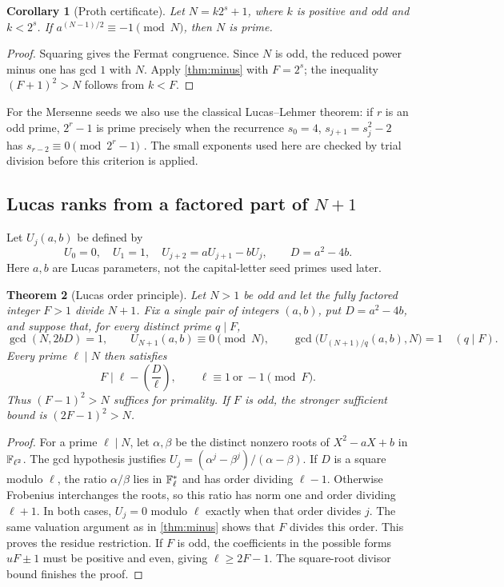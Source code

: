 \documentclass[11pt,a4paper]{article}
\newtheorem{theorem}{Theorem}[section]
\newtheorem{corollary}[theorem]{Corollary}
\theoremstyle{definition}\newtheorem{definition}[theorem]{Definition}
\theoremstyle{remark}\newtheorem{remark}[theorem]{Remark}
\begin{document}
\begin{corollary}[Proth certificate]\label{cor:proth}
Let $N=k2^s+1$, where $k$ is positive and odd and $k<2^s$. If
$a^{(N-1)/2}\equiv-1\pmod N$, then $N$ is prime.
\end{corollary}
\begin{proof}
Squaring gives the Fermat congruence. Since $N$ is odd, the reduced power minus
one has gcd $1$ with $N$. Apply \cref{thm:minus} with $F=2^s$; the inequality
$(F+1)^2>N$ follows from $k<F$.
\end{proof}

For the Mersenne seeds we also use the classical Lucas--Lehmer theorem:
if $r$ is an odd prime, $2^r-1$ is prime precisely when the recurrence
$s_0=4$, $s_{j+1}=s_j^2-2$ has $s_{r-2}\equiv0\pmod{2^r-1}$
\cite{lehmertest}. The small exponents used here are checked by trial division
before this criterion is applied.

\subsection{Lucas ranks from a factored part of \texorpdfstring{$N+1$}{N+1}}

Let $U_j(a,b)$ be defined by
\[
 U_0=0,\quad U_1=1,\quad U_{j+2}=aU_{j+1}-bU_j,
 \qquad D=a^2-4b.
\]
Here $a,b$ are Lucas parameters, not the capital-letter seed primes used later.

\begin{theorem}[Lucas order principle]\label{thm:plus}
Let $N>1$ be odd and let the fully factored integer $F>1$ divide $N+1$.
Fix a single pair of integers $(a,b)$, put $D=a^2-4b$, and suppose that,
for every distinct prime $q\mid F$,
\begin{equation}\label{eq:lucas}
 \gcd(N,2bD)=1,\qquad U_{N+1}(a,b)\equiv0\pmod N,
 \qquad \gcd\bigl(U_{(N+1)/q}(a,b),N\bigr)=1
 \quad(q\mid F).
\end{equation}
Every prime $\ell\mid N$ then satisfies
\[
 F\mid\ell-\left(\frac D\ell\right),\qquad
 \ell\equiv1\ \text{or}\ -1\pmod F.
\]
Thus $(F-1)^2>N$ suffices for primality. If $F$ is odd, the stronger sufficient
bound is $(2F-1)^2>N$.
\end{theorem}

\begin{proof}
For a prime $\ell\mid N$, let $\alpha,\beta$ be the distinct nonzero roots of
$X^2-aX+b$ in $\mathbb F_{\ell^2}$. The gcd hypothesis justifies
$U_j=(\alpha^j-\beta^j)/(\alpha-\beta)$. If $D$ is a square modulo $\ell$,
the ratio $\alpha/\beta$ lies in $\mathbb F_\ell^*$ and has order dividing $\ell-1$.
Otherwise Frobenius interchanges the roots, so this ratio has norm one and
order dividing $\ell+1$. In both cases, $U_j=0$ modulo $\ell$ exactly when
that order divides $j$. The same valuation argument as in
\cref{thm:minus} shows that $F$ divides this order. This proves the residue
restriction. If $F$ is odd, the coefficients in the possible forms $uF\pm1$
must be positive and even, giving $\ell\ge2F-1$. The square-root divisor
bound finishes the proof.
\end{proof}
\end{document}
